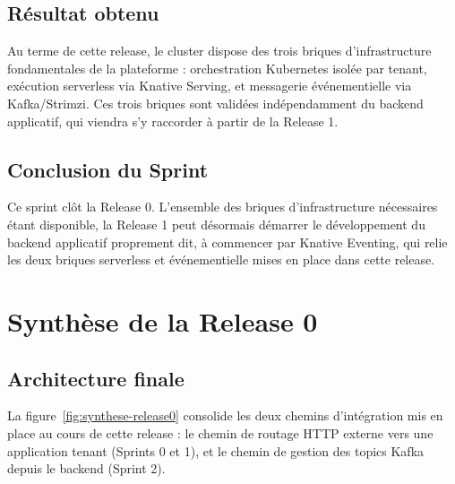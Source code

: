 
\subsection{Résultat obtenu}

Au terme de cette release, le cluster dispose des trois briques d'infrastructure fondamentales de la plateforme : orchestration Kubernetes isolée par tenant, exécution serverless via Knative Serving, et messagerie événementielle via Kafka/Strimzi. Ces trois briques sont validées indépendamment du backend applicatif, qui viendra s'y raccorder à partir de la Release 1.

\subsection{Conclusion du Sprint}

Ce sprint clôt la Release 0. L'ensemble des briques d'infrastructure nécessaires étant disponible, la Release 1 peut désormais démarrer le développement du backend applicatif proprement dit, à commencer par Knative Eventing, qui relie les deux briques serverless et événementielle mises en place dans cette release.


\section{Synthèse de la Release 0}

\subsection{Architecture finale}

La figure~\ref{fig:synthese-release0} consolide les deux chemins d'intégration mis en place au cours de cette release : le chemin de routage HTTP externe vers une application tenant (Sprints 0 et 1), et le chemin de gestion des topics Kafka depuis le backend (Sprint 2).

